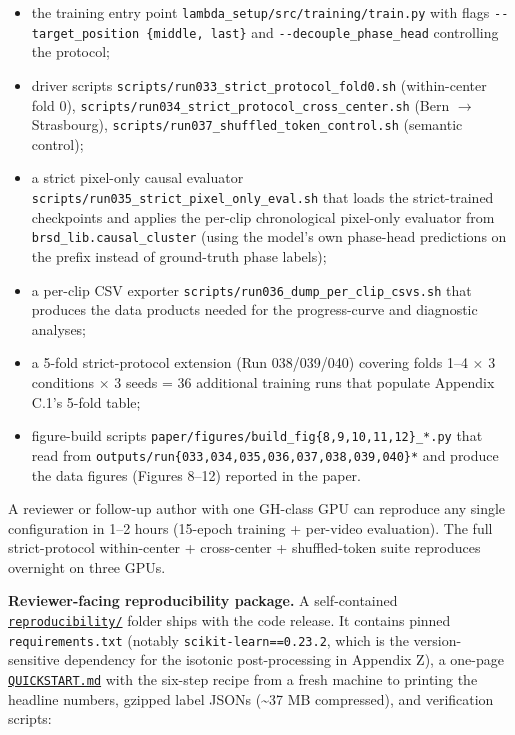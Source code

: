 \begin{itemize}
\tightlist
\item
  the training entry point \texttt{lambda\_setup/src/training/train.py}
  with flags \texttt{-\/-target\_position\ \{middle,\ last\}} and
  \texttt{-\/-decouple\_phase\_head} controlling the protocol;
\item
  driver scripts \texttt{scripts/run033\_strict\_protocol\_fold0.sh}
  (within-center fold 0),
  \texttt{scripts/run034\_strict\_protocol\_cross\_center.sh} (Bern $\rightarrow$
  Strasbourg), \texttt{scripts/run037\_shuffled\_token\_control.sh}
  (semantic control);
\item
  a strict pixel-only causal evaluator
  \texttt{scripts/run035\_strict\_pixel\_only\_eval.sh} that loads the
  strict-trained checkpoints and applies the per-clip chronological
  pixel-only evaluator from \texttt{brsd\_lib.causal\_cluster} (using
  the model's own phase-head predictions on the prefix instead of
  ground-truth phase labels);
\item
  a per-clip CSV exporter
  \texttt{scripts/run036\_dump\_per\_clip\_csvs.sh} that produces the
  data products needed for the progress-curve and diagnostic analyses;
\item
  a 5-fold strict-protocol extension (Run 038/039/040) covering folds
  1--4 $\times$ 3 conditions $\times$ 3 seeds = 36 additional training runs that
  populate Appendix C.1's 5-fold table;
\item
  figure-build scripts
  \texttt{paper/figures/build\_fig\{8,9,10,11,12\}\_*.py} that read from
  \texttt{outputs/run\{033,034,035,036,037,038,039,040\}*} and produce
  the data figures (Figures 8--12) reported in the paper.
\end{itemize}

A reviewer or follow-up author with one GH-class GPU can reproduce any
single configuration in 1--2 hours (15-epoch training + per-video
evaluation). The full strict-protocol within-center + cross-center +
shuffled-token suite reproduces overnight on three GPUs.

\textbf{Reviewer-facing reproducibility package.} A self-contained
\href{reproducibility/}{\texttt{reproducibility/}} folder ships with the
code release. It contains pinned \texttt{requirements.txt} (notably
\texttt{scikit-learn==0.23.2}, which is the version-sensitive dependency
for the isotonic post-processing in Appendix Z), a one-page
\href{reproducibility/QUICKSTART.md}{\texttt{QUICKSTART.md}} with the
six-step recipe from a fresh machine to printing the headline numbers,
gzipped label JSONs (\textasciitilde37 MB compressed), and verification
scripts:

